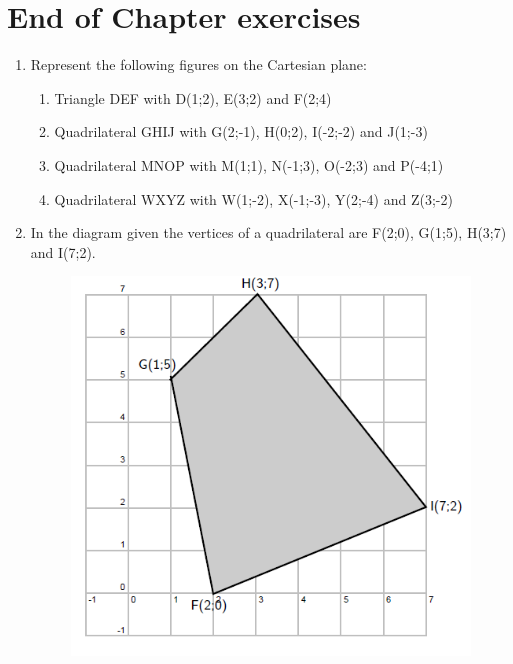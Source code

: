             \section{ End of Chapter exercises}
            \nopagebreak
        \label{m39167*id69671}\begin{enumerate}[noitemsep, label=\textbf{\arabic*}. ] 
            \label{m39167*uid43466}\item 
Represent the following figures on the Cartesian plane: \label{m39167*id6549695}\begin{enumerate}[noitemsep, label=\textbf{\alph*}. ] 
            \label{m39167*uid4746}\item 
Triangle DEF with D(1;2), E(3;2) and F(2;4) 
\label{m39167*uid4548}\item Quadrilateral GHIJ with G(2;-1), H(0;2), I(-2;-2) and J(1;-3)
\label{m39167*uid4549}\item  Quadrilateral MNOP with M(1;1), N(-1;3), O(-2;3) and P(-4;1) 
\label{m39167*uid5450}\item  Quadrilateral WXYZ with W(1;-2), X(-1;-3), Y(2;-4) and Z(3;-2)
\end{enumerate}
                \label{m39167*uid46}\item 
In the diagram given the vertices of a quadrilateral are F(2;0), G(1;5), H(3;7) and I(7;2).
    \setcounter{subfigure}{0}
	\begin{figure}[H] %
    \begin{center}
    \label{m39167*id69688!!!underscore!!!media}\label{m39167*id69688!!!underscore!!!printimage}\includegraphics[width=0.4\columnwidth]{col11306.imgs/m39167_MG10C14_021.png} %
      \vspace{2pt}
    \vspace{.1in}
    \end{center}
 \end{figure}       \label{m39167*id69695}\begin{enumerate}[noitemsep, label=\textbf{\alph*}. ] 

\end{enumerate}
\end{enumerate}
